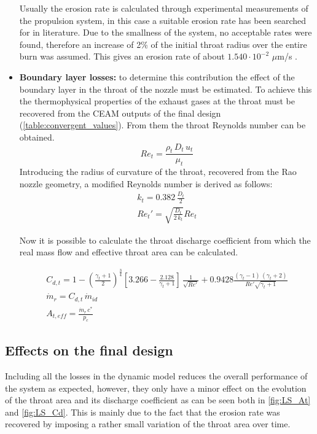 \begin{itemize}
    Usually the erosion rate is calculated through experimental measurements of the propulsion system, in this case a suitable erosion rate has been searched for in literature. Due to the smallness of the system, no acceptable rates were found, therefore an increase of 2\% of the initial throat radius over the entire burn was assumed.
    This gives an erosion rate of about $1.540 \cdot 10^{-2}$ $\mu$m/s \cite{sutton}\cite{tesi_malesia}.
    \item \textbf{Boundary layer losses:} to determine this contribution the effect of the boundary layer in the throat of the nozzle must be estimated. To achieve this the thermophysical properties of the exhaust gases at the throat must be recovered from the CEAM outputs of the final design (\autoref{table:convergent_values}). From them the throat Reynolds number can be obtained.
    \begin{equation}
        Re_t = \frac{\rho_t \, D_t \, u_t}{\mu_t}
    \end{equation}
Introducing the radius of curvature of the throat, recovered from the Rao nozzle geometry, a modified Reynolds number is derived as follows:
    \begin{gather}
        k_t = 0.382 \, \frac{D_t}{2} \\
        Re_t'=\sqrt{\frac{D_t}{2 \, k_t}}Re_t
    \end{gather}  

    Now it is possible to calculate the throat discharge coefficient from which the real mass flow and effective throat area can be calculated.  

    \begin{gather}
        C_{d,t} = 1 - \left( \frac{\gamma_t+1}{2} \right)^{\frac{3}{4}}
        \left[3.266 - \frac{2.128}{\gamma_t+1} \right] \, \frac{1}{\sqrt{Re'}} + 0.9428 \frac{(\gamma_t - 1) \, (\gamma_t + 2)}{Re' \sqrt{\gamma_t + 1}} \\
        \dot{m}_r = C_{d,t} \, \dot{m}_{id} \\
        A_{t,eff} = \frac{\dot{m}_r \, c^*}{p_c}
    \end{gather}
\end{itemize}

\subsection{Effects on the final design}
\label{subsec:effects_losses}

Including all the losses in the dynamic model reduces the overall performance of the system as expected, however, they only have a minor effect on the evolution of the throat area and its discharge coefficient as can be seen both in \autoref{fig:LS_At} and \autoref{fig:LS_Cd}. This is mainly due to the fact that the erosion rate was recovered by imposing a rather small variation of the throat area over time. 


